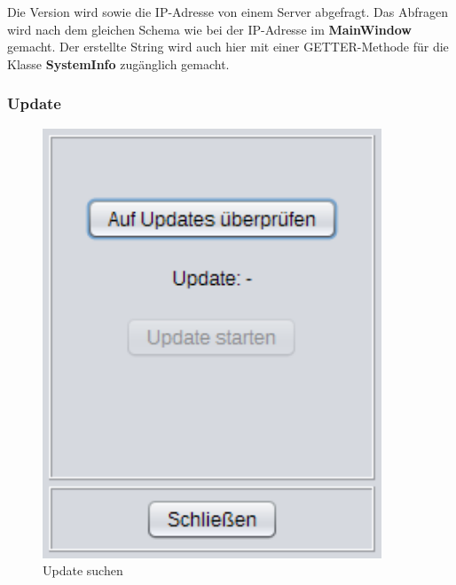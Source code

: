 Die Version wird sowie die \ac{IP}-Adresse von einem Server abgefragt. Das Abfragen wird nach dem gleichen Schema wie bei der \ac{IP}-Adresse im \textbf{MainWindow} gemacht. Der erstellte String wird auch hier mit einer GETTER-Methode für die Klasse \textbf{SystemInfo} zugänglich gemacht.


\newpage

\subsubsection{Update}\label{subsubsec:Update}
\begin{figure}[H]
  \begin{minipage}[hbt]{0.45\textwidth}
    \includegraphics[width=0.9\textwidth]{Bilder/GUI/Update1}
 	\caption{Update suchen}
  	\label{Update}
  \end{minipage}
\hspace{.03\linewidth}
  \begin{minipage}[hbt]{0.45\textwidth}

\end{minipage}
\end{figure}
